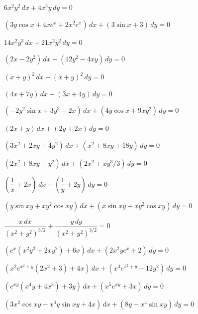 \begin{exerciselist}
\item\label{exer:2.5.1}$6x^2y^2\,dx+4x^3y\,dy=0$

\item\label{exer:2.5.2}$(3y\cos x+4xe^x+2x^2e^x)\,dx+(3\sin x+3)\,dy=0$

\item\label{exer:2.5.3}$14x^2y^3\,dx+21 x^2y^2\,dy=0$

\item\label{exer:2.5.4}$(2x-2y^2)\,dx+(12y^2-4xy)\,dy=0$

\item\label{exer:2.5.5}$(x+y)^2\,dx+(x+y)^2\,dy=0$%
\item\label{exer:2.5.6}$(4x+7y)\,dx+(3x+4y)\,dy=0$

\item\label{exer:2.5.7}$(-2y^2\sin x+3y^3-2x)\,dx+(4y\cos x+9xy^2)\,dy=0$

\item\label{exer:2.5.8}$(2x+y)\,dx+(2y+2x)\,dy=0$

\item\label{exer:2.5.9}$(3x^2+2xy+4y^2)\,dx+(x^2+8xy+18y)\,dy=0$

\item\label{exer:2.5.10}$(2x^2+8xy+y^2)\,dx+(2x^2+xy^3/3)\,dy=0$

\item\label{exer:2.5.11}$\left(\dfrac{1}{x}+2x\right)\,dx+
\left(\dfrac{1}{y}+2y\right)\,dy=0$

\item\label{exer:2.5.12}$(y\sin xy+xy^2\cos xy)\,dx+(x\sin xy+xy^2\cos xy)\,dy=0$

\item\label{exer:2.5.13}$\dfrac{x\,dx}{(x^2+y^2)^{3/2}}+\dfrac{y\,dy}{(x^2+y^2)^{3/2}}=0$

\item\label{exer:2.5.14}$\left(e^x(x^2y^2+2xy^2)+6x\right)\,dx+(2x^2ye^x+2)\,dy=0$

\item\label{exer:2.5.15}$\left(x^2e^{x^2+y}(2x^2+3)+4x\right)\,dx+(x^3e^{x^2+y}-12y^2)\,dy=0$

\item\label{exer:2.5.16}$\left(e^{xy}(x^4y+4x^3)+3y\right)\,dx+(x^5e^{xy}+3x)\,dy=0$

\item\label{exer:2.5.17}$(3x^2\cos xy-x^3y\sin xy+4x)\,dx+(8y-x^4\sin xy)\,dy=0$


\end{exerciselist}
